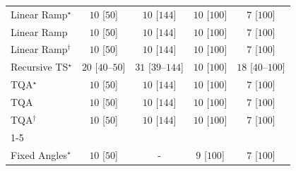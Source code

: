 \begin{tabular}{l|cccc|}
Linear Ramp$^\star$ & {\cellcolor[HTML]{F7FCF5}} \color[HTML]{000000} $10$ [$50$] & {\cellcolor[HTML]{F7FCF5}} \color[HTML]{000000} $10$ [$144$] & {\cellcolor[HTML]{F7FCF5}} \color[HTML]{000000} $10$ [$100$] & {\cellcolor[HTML]{F7FCF5}} \color[HTML]{000000} $7$ [$100$] \\
Linear Ramp & {\cellcolor[HTML]{F7FCF5}} \color[HTML]{000000} $10$ [$50$] & {\cellcolor[HTML]{F7FCF5}} \color[HTML]{000000} $10$ [$144$] & {\cellcolor[HTML]{F7FCF5}} \color[HTML]{000000} $10$ [$100$] & {\cellcolor[HTML]{F7FCF5}} \color[HTML]{000000} $7$ [$100$] \\
Linear Ramp$^\dagger$ & {\cellcolor[HTML]{F7FCF5}} \color[HTML]{000000} $10$ [$50$] & {\cellcolor[HTML]{F7FCF5}} \color[HTML]{000000} $10$ [$144$] & {\cellcolor[HTML]{F7FCF5}} \color[HTML]{000000} $10$ [$100$] & {\cellcolor[HTML]{F7FCF5}} \color[HTML]{000000} $7$ [$100$] \\
Recursive TS$^\star$ & {\cellcolor[HTML]{F5FBF2}} \color[HTML]{000000} $20$ [$40$--$50$] & {\cellcolor[HTML]{F3FAF0}} \color[HTML]{000000} $31$ [$39$--$144$] & {\cellcolor[HTML]{F7FCF5}} \color[HTML]{000000} $10$ [$100$] & {\cellcolor[HTML]{F5FBF3}} \color[HTML]{000000} $18$ [$40$--$100$] \\
TQA$^\star$ & {\cellcolor[HTML]{F7FCF5}} \color[HTML]{000000} $10$ [$50$] & {\cellcolor[HTML]{F7FCF5}} \color[HTML]{000000} $10$ [$144$] & {\cellcolor[HTML]{F7FCF5}} \color[HTML]{000000} $10$ [$100$] & {\cellcolor[HTML]{F7FCF5}} \color[HTML]{000000} $7$ [$100$] \\
TQA & {\cellcolor[HTML]{F7FCF5}} \color[HTML]{000000} $10$ [$50$] & {\cellcolor[HTML]{F7FCF5}} \color[HTML]{000000} $10$ [$144$] & {\cellcolor[HTML]{F7FCF5}} \color[HTML]{000000} $10$ [$100$] & {\cellcolor[HTML]{F7FCF5}} \color[HTML]{000000} $7$ [$100$] \\
TQA$^\dagger$ & {\cellcolor[HTML]{F7FCF5}} \color[HTML]{000000} $10$ [$50$] & {\cellcolor[HTML]{F7FCF5}} \color[HTML]{000000} $10$ [$144$] & {\cellcolor[HTML]{F7FCF5}} \color[HTML]{000000} $10$ [$100$] & {\cellcolor[HTML]{F7FCF5}} \color[HTML]{000000} $7$ [$100$] \\
\cline{1-5}
\multicolumn{5}{c}{\rule{0pt}{8pt}PP} \\
\midrule
Fixed Angles$^\star$ & {\cellcolor[HTML]{F7FCF5}} \color[HTML]{000000} $10$ [$50$] & {\cellcolor[HTML]{000000}} \color[HTML]{F1F1F1} {\cellcolor{white}} \color{black} - & {\cellcolor[HTML]{F7FCF5}} \color[HTML]{000000} $9$ [$100$] & {\cellcolor[HTML]{F7FCF5}} \color[HTML]{000000} $7$ [$100$] \\

\end{tabular}
